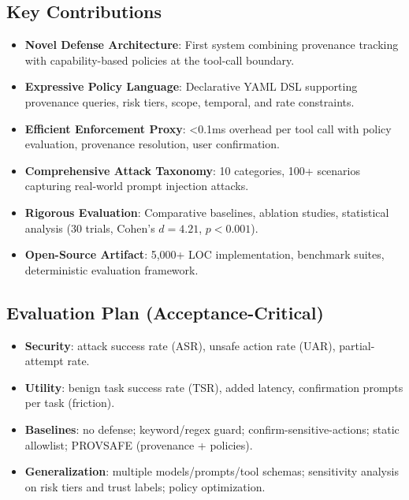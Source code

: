 \subsection{Key Contributions}
\begin{itemize}[leftmargin=1.2em]
  \item \textbf{Novel Defense Architecture}: First system combining provenance tracking with capability-based policies at the tool-call boundary.
  \item \textbf{Expressive Policy Language}: Declarative YAML DSL supporting provenance queries, risk tiers, scope, temporal, and rate constraints.
  \item \textbf{Efficient Enforcement Proxy}: <0.1ms overhead per tool call with policy evaluation, provenance resolution, user confirmation.
  \item \textbf{Comprehensive Attack Taxonomy}: 10 categories, 100+ scenarios capturing real-world prompt injection attacks.
  \item \textbf{Rigorous Evaluation}: Comparative baselines, ablation studies, statistical analysis (30 trials, Cohen's $d=4.21$, $p<0.001$).
  \item \textbf{Open-Source Artifact}: 5,000+ LOC implementation, benchmark suites, deterministic evaluation framework.
\end{itemize}

\subsection{Evaluation Plan (Acceptance-Critical)}
\begin{itemize}[leftmargin=1.2em]
  \item \textbf{Security}: attack success rate (ASR), unsafe action rate (UAR), partial-attempt rate.
  \item \textbf{Utility}: benign task success rate (TSR), added latency, confirmation prompts per task (friction).
  \item \textbf{Baselines}: no defense; keyword/regex guard; confirm-sensitive-actions; static allowlist; PROVSAFE (provenance + policies).
  \item \textbf{Generalization}: multiple models/prompts/tool schemas; sensitivity analysis on risk tiers and trust labels; policy optimization.
\end{itemize}

